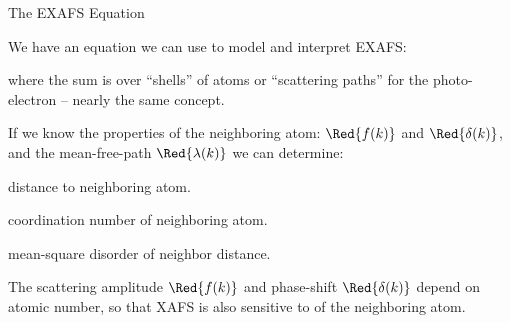 \begin{slide}{The EXAFS Equation}

    
  We have an equation we can use to model and interpret EXAFS:
    
  \begin{center}
    \highlightbox{
      \begin{minipage}{100mm} 
        \[ \chi(k) = \sum_j \frac{ {\Blue{N_j}} S_0^2 {\Red{f_j(k)}}
            e^{-2{\Blue{R_j}}/{\Red{\lambda(k)}}}\, 
            e^{-2k^2{\Blue{\sigma_j^2}}}}{k{\Blue{R_j}}^2}
          \sin{ [ 2k{\Blue{R_j}} + \Red{\delta_j(k)} ]} \] \end{minipage}
      }
    \end{center}

    
    \vmm
    where the sum is over ``shells'' of atoms or ``scattering paths'' for
    the photo-electron -- nearly the same concept.

    \vmm If we know the {} properties of the
    neighboring atom: ${{\Red{f(k)}}}$ and $\Red{\delta(k)}$, and the
    mean-free-path $\Red{\lambda(k)}$ we can determine:
   
      
    \vmm
    \begin{description}  \settowidth{\labelwidth}{10mm}
      \setlength{\itemindent}{5mm}
    \item[$\Blue{R}$]  distance to neighboring atom.  
    \item[$\Blue{N}$]  coordination number of neighboring atom.
    \item[$\Blue{\sigma^2}$] mean-square disorder of    neighbor distance.
    \end{description}

    
    The scattering amplitude $\Red{f(k)}$ and phase-shift $\Red{\delta(k)}$
    depend on atomic number, so that XAFS is also sensitive to
    {} of the neighboring atom.
    
\end{slide} 
